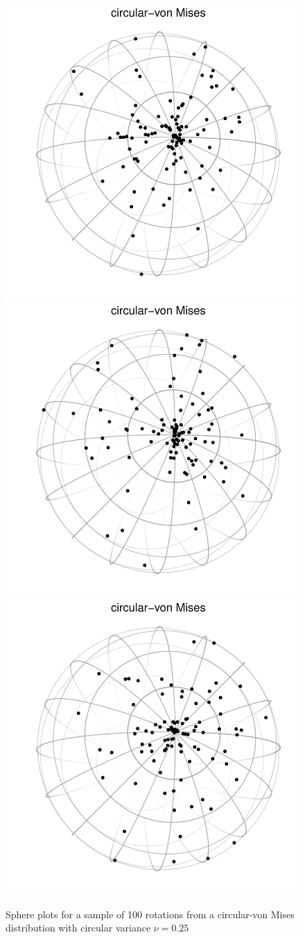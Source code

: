 \documentclass[12pt]{article}
\begin{document}
\begin{figure}
\centering
\includegraphics[width=.3\linewidth]{eye-vmises}
\includegraphics[width=.3\linewidth]{eye-vmises-2}
\includegraphics[width=.3\linewidth]{eye-vmises-3}
\caption{\label{fig:eye-vmises}Sphere plots for a sample of 100 rotations from a circular-von Mises distribution with circular variance $\nu=0.25$}
\end{figure}
\end{document}
